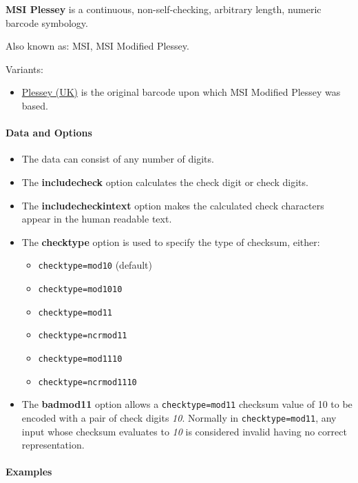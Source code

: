 \textbf{MSI Plessey} is a continuous, non-self-checking, arbitrary
length, numeric barcode symbology.

Also known as: MSI, MSI Modified Plessey.

Variants:

\begin{itemize}
\tightlist
\item
  \protect\hyperlink{plessey}{Plessey (UK)} is the original barcode upon
  which MSI Modified Plessey was based.
\end{itemize}

\hypertarget{data-and-options-74}{%
\paragraph{Data and Options}\label{data-and-options-74}}

\begin{itemize}
\tightlist
\item
  The data can consist of any number of digits.
\item
  The \textbf{includecheck} option calculates the check digit or check
  digits.
\item
  The \textbf{includecheckintext} option makes the calculated check
  characters appear in the human readable text.
\item
  The \textbf{checktype} option is used to specify the type of checksum,
  either:

  \begin{itemize}
  \tightlist
  \item
    \texttt{checktype=mod10} (default)
  \item
    \texttt{checktype=mod1010}
  \item
    \texttt{checktype=mod11}
  \item
    \texttt{checktype=ncrmod11}
  \item
    \texttt{checktype=mod1110}
  \item
    \texttt{checktype=ncrmod1110}
  \end{itemize}
\item
  The \textbf{badmod11} option allows a \texttt{checktype=mod11}
  checksum value of 10 to be encoded with a pair of check digits
  \emph{10}. Normally in \texttt{checktype=mod11}, any input whose
  checksum evaluates to \emph{10} is considered invalid having no
  correct representation.
\end{itemize}

\hypertarget{examples-48}{%
\paragraph{Examples}\label{examples-48}}


